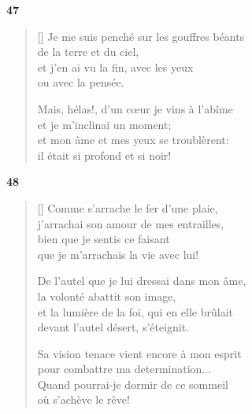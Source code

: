 \documentclass[a4paper,12pt]{book}
\begin{document}
\bigskip

\begin{center}
  \textbf{47}
\end{center}

\settowidth{\versewidth}{Je me suis penché sur les gouffres béants}

\begin{verse}[\versewidth]
  Je me suis penché sur les gouffres béants \\
  de la terre et du ciel, \\
  et j'en ai vu la fin, avec les yeux \\
  ou avec la pensée.

  Mais, hélas!, d'un cœur je vins à l'abîme \\
  et je m'inclinai un moment; \\
  et mon âme et mes yeux se troublèrent: \\
  il était si profond et si noir!
\end{verse}

\bigskip

\begin{center}
  \textbf{48}
\end{center}

\settowidth{\versewidth}{et la lumière de la foi, qui en elle brûlait}

\begin{verse}[\versewidth]
  Comme s'arrache le fer d'une plaie, \\
  j'arrachai son amour de mes entrailles, \\
  bien que je sentis ce faisant \\
  que je m'arrachais la vie avec lui!

  De l'autel que je lui dressai dans mon âme, \\
  la volonté abattit son image, \\
  et la lumière de la foi, qui en elle brûlait \\
  devant l'autel désert, s'éteignit.

  Sa vision tenace vient encore à mon esprit \\
  pour combattre ma determination... \\
  Quand pourrai-je dormir de ce sommeil \\
  où s'achève le rêve!
\end{verse}
\end{document}
